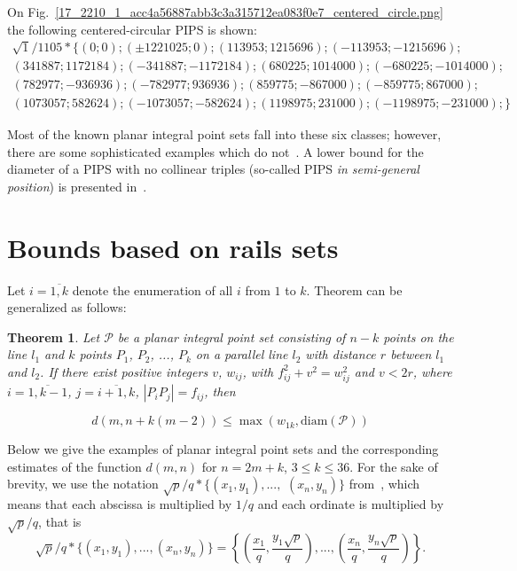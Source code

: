 \documentclass[12pt]{article}
\theoremstyle{theorem}
\newtheorem{theorem}{Theorem}
\theoremstyle{dfn}
\theoremstyle{remark}
\begin{document}
On Fig.~\ref{17_2210_1_acc4a56887abb3c3a315712ea083f0e7_centered_circle.png} the following centered-circular PIPS is shown:
\begin{multline*}
	\sqrt{1}/1105*\{
	( 0 ; 0);
	( \pm1221025 ; 0);
	( 113953 ; 1215696);
	( -113953 ; -1215696);
	\\
	( 341887 ; 1172184);
	( -341887 ; -1172184);
	( 680225 ; 1014000);
	( -680225 ; -1014000);
	\\
	( 782977 ; -936936);
	( -782977 ; 936936);
	( 859775 ; -867000);
	( -859775 ; 867000);
	\\
	( 1073057 ; 582624);
	( -1073057 ; -582624);
	( 1198975 ; 231000);
	( -1198975 ; -231000);
\}
\end{multline*}

Most of the known planar integral point sets fall into these six classes;
however, there are some sophisticated examples which do not~\cite{kreisel2008heptagon,kurz2013constructing,avdeev2021particular}.
A lower bound for the diameter of a PIPS with no collinear triples (so-called PIPS \textit{in semi-general position})
is presented in~\cite{my-semi-general-5-4-bound-2019}.



\section{Bounds based on rails sets}
\label{sec:bounds_rails}

Let $i = \overline{1, k}$ denote the enumeration of all $i$
from $1$ to $k$.
Theorem \cite[Theorem 2.1]{kurz2008bounds} can be generalized as follows:

\begin{theorem}
	\label{thm:rails_blowup}
	Let $\mathcal{P}$ be a planar integral point set consisting of
	$n - k$ points on the line $l_1$ and $k$ points $P_1$, $P_2$, ..., $P_k$ on a
	parallel line $l_2$ with distance $r$ between $l_1$ and $l_2$. If there
	exist positive integers $v$, $w_{ij}$, with $f_{ij}^{2} + v^{2}
	= w_{ij}^{2}$ and $v < 2r$, where $i = \overline{1, k - 1}$, $j =
	\overline{i + 1, k}$, $|P_{i}P_{j}| = f_{ij}$,
	then

	\begin{equation}
		d(m, n + k(m - 2)) \leq \max(w_{1k}, \operatorname{diam(\mathcal{P})})
	\end{equation}

\end{theorem}

Below we give the examples of planar integral point sets and the corresponding
estimates of the function $d(m, n)$ for $n = 2m + k$, $3 \leq k \leq 36$.
For the sake of brevity, we use the notation
$\sqrt{p}/q * \{ (x_1,y_1), ...,$ $ (x_n, y_n)  \}$
from~\cite{our-ped-2018,our-pmm-2018,our-vmmsh-2018},
which means that each abscissa is multiplied by $1/q$
and each ordinate is multiplied by $\sqrt{p}/q$,  that is
$$
	\sqrt{p}/q * \{ (x_1,y_1), ..., (x_n, y_n)  \}
	=
	\left\{ \left(\frac{x_1}{q},\frac{y_1\sqrt{p}}{q}\right), ..., \left(\frac{x_n}{q},   \frac{y_n\sqrt{p}}{q}\right)  \right\}.
$$
\end{document}
